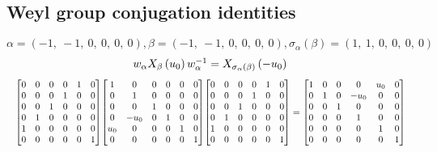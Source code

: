 \documentclass[11pt]{article}
\theoremstyle{definition}
\begin{document}
\subsection{Weyl group conjugation identities}

\providecommand{\scaletoalign}[2]{%
  \sbox0{$#2$}%
  \ifdim\wd0>#1\relax 
    \resizebox{#1}{!}{\usebox0}%
  \else 
    \usebox0%
  \fi 
}
\[
\alpha = \left( -1, \  -1, \  0, \  0, \  0, \  0\right), \beta = \left( -1, \  -1, \  0, \  0, \  0, \  0\right), \sigma_{\alpha}(\beta) = \left( 1, \  1, \  0, \  0, \  0, \  0\right)
\]
\[
\scaletoalign{\textwidth}{w_{\alpha} X_{\beta}\left(u_{0}\right) w_{\alpha}^{-1} = X_{\sigma_{\alpha}\left(\beta\right)}\left(- u_{0}\right)}
\]
\[
\scaletoalign{\textwidth}{{\left[\begin{matrix}0 & 0 & 0 & 0 & 1 & 0\\0 & 0 & 0 & 1 & 0 & 0\\0 & 0 & 1 & 0 & 0 & 0\\0 & 1 & 0 & 0 & 0 & 0\\1 & 0 & 0 & 0 & 0 & 0\\0 & 0 & 0 & 0 & 0 & 1\end{matrix}\right]} {\left[\begin{matrix}1 & 0 & 0 & 0 & 0 & 0\\0 & 1 & 0 & 0 & 0 & 0\\0 & 0 & 1 & 0 & 0 & 0\\0 & - u_{0} & 0 & 1 & 0 & 0\\u_{0} & 0 & 0 & 0 & 1 & 0\\0 & 0 & 0 & 0 & 0 & 1\end{matrix}\right]} {\left[\begin{matrix}0 & 0 & 0 & 0 & 1 & 0\\0 & 0 & 0 & 1 & 0 & 0\\0 & 0 & 1 & 0 & 0 & 0\\0 & 1 & 0 & 0 & 0 & 0\\1 & 0 & 0 & 0 & 0 & 0\\0 & 0 & 0 & 0 & 0 & 1\end{matrix}\right]} = {\left[\begin{matrix}1 & 0 & 0 & 0 & u_{0} & 0\\0 & 1 & 0 & - u_{0} & 0 & 0\\0 & 0 & 1 & 0 & 0 & 0\\0 & 0 & 0 & 1 & 0 & 0\\0 & 0 & 0 & 0 & 1 & 0\\0 & 0 & 0 & 0 & 0 & 1\end{matrix}\right]}}
\]
\end{document}
